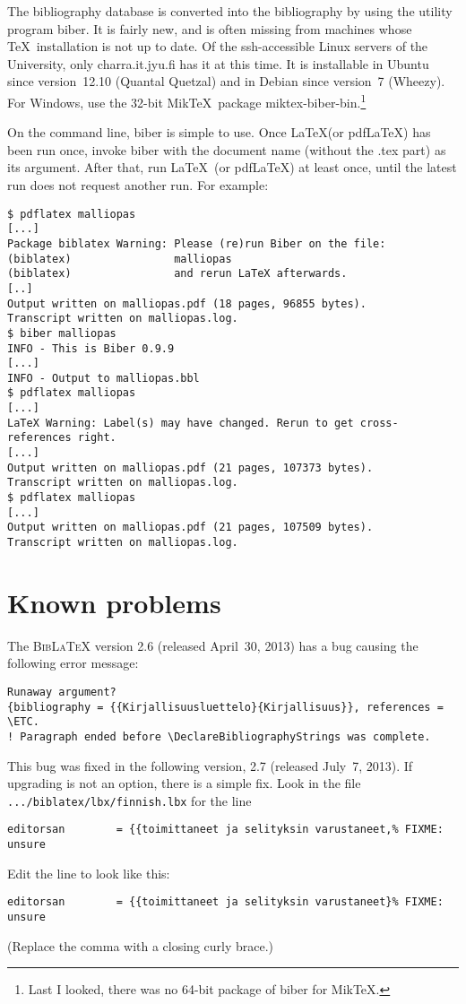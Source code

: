 \documentclass[utf8,english]{gradu3}
\begin{document}
The bibliography database is converted into the bibliography by using
the utility program {biber}.  It is fairly new, and is often missing
from machines whose \TeX\ installation is not up to date.  Of the
ssh-accessible Linux servers of the University, only charra.it.jyu.fi
has it at this time.  It is installable in Ubuntu since version~12.10
(Quantal Quetzal) and in Debian since version~7 (Wheezy).  For
Windows, use the 32-bit Mik\TeX\ package
miktex-biber-bin.\footnote{Last I looked, there was no 64-bit package
  of biber for Mik\TeX.}

On the command line, biber is simple to use.  Once \LaTeX (or
pdf\LaTeX) has been run once, invoke biber with the document name
(without the .tex part) as its argument.  After that, run \LaTeX\ (or
pdf\LaTeX) at least once, until the latest run does not request
another run.  For example:

\begingroup\footnotesize
\begin{verbatim}
$ pdflatex malliopas
[...]
Package biblatex Warning: Please (re)run Biber on the file:
(biblatex)                malliopas
(biblatex)                and rerun LaTeX afterwards.
[..]
Output written on malliopas.pdf (18 pages, 96855 bytes).
Transcript written on malliopas.log.
$ biber malliopas
INFO - This is Biber 0.9.9
[...]
INFO - Output to malliopas.bbl
$ pdflatex malliopas
[...]
LaTeX Warning: Label(s) may have changed. Rerun to get cross-references right.
[...]
Output written on malliopas.pdf (21 pages, 107373 bytes).
Transcript written on malliopas.log.
$ pdflatex malliopas
[...]
Output written on malliopas.pdf (21 pages, 107509 bytes).
Transcript written on malliopas.log.
\end{verbatim}
\endgroup

\section{Known problems}

The \textsc{Bib\LaTeX} version 2.6 (released April~30, 2013) has a bug
causing the following error message:%
{\footnotesize%
\begin{verbatim}
Runaway argument?
{bibliography = {{Kirjallisuusluettelo}{Kirjallisuus}}, references = \ETC.
! Paragraph ended before \DeclareBibliographyStrings was complete.
\end{verbatim}
}%
This bug was fixed in the following version, 2.7 (released July~7,
2013).  If upgrading is not an option, there is a simple fix.  Look in
the file \texttt{.../biblatex/lbx/finnish.lbx} for the line
{\footnotesize%
\begin{verbatim}
editorsan        = {{toimittaneet ja selityksin varustaneet,% FIXME: unsure
\end{verbatim}
}%
Edit the line to look like this:
{\footnotesize%
\begin{verbatim}
editorsan        = {{toimittaneet ja selityksin varustaneet}% FIXME: unsure
\end{verbatim}
}%
(Replace the comma with a closing curly brace.)
\end{document}
